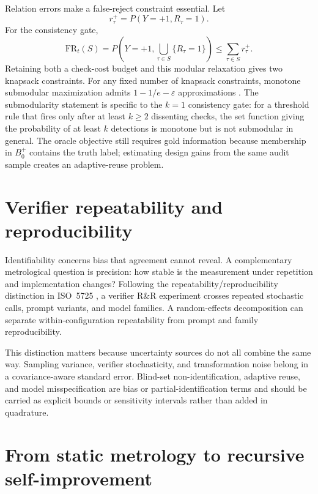\documentclass[11pt]{article}
\theoremstyle{definition}
\theoremstyle{remark}
\begin{document}
Relation errors make a false-reject constraint essential. Let
\[
r_\tau^+=P(Y=+1,R_\tau=1).
\]
For the consistency gate,
\[
\mathrm{FR}_t(S)
=P\left(Y=+1,\bigcup_{\tau\in S}\{R_\tau=1\}\right)
\le\sum_{\tau\in S}r_\tau^+.
\]
Retaining both a check-cost budget and this modular relaxation gives two knapsack constraints. For any fixed number of knapsack constraints, monotone submodular maximization admits $1-1/e-\varepsilon$ approximations \cite{kulik2013}. The submodularity statement is specific to the $k=1$ consistency gate: for a threshold rule that fires only after at least $k\ge2$ dissenting checks, the set function giving the probability of at least $k$ detections is monotone but is not submodular in general. The oracle objective still requires gold information because membership in $B_0^+$ contains the truth label; estimating design gains from the same audit sample creates an adaptive-reuse problem.

\section{Verifier repeatability and reproducibility}
\label{sec:rr}

Identifiability concerns bias that agreement cannot reveal. A complementary metrological question is precision: how stable is the measurement under repetition and implementation changes? Following the repeatability/reproducibility distinction in ISO~5725 \cite{iso5725}, a verifier R\&R experiment crosses repeated stochastic calls, prompt variants, and model families. A random-effects decomposition can separate within-configuration repeatability from prompt and family reproducibility.

This distinction matters because uncertainty sources do not all combine the same way. Sampling variance, verifier stochasticity, and transformation noise belong in a covariance-aware standard error. Blind-set non-identification, adaptive reuse, and model misspecification are bias or partial-identification terms and should be carried as explicit bounds or sensitivity intervals rather than added in quadrature.

\section{From static metrology to recursive self-improvement}
\label{sec:dynamics}
\end{document}
